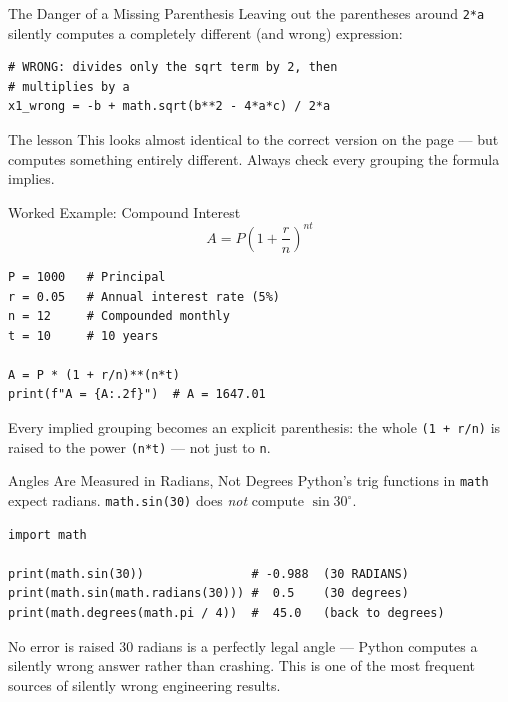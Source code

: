 \documentclass[9pt,aspectratio=169,xcolor=table]{beamer}
\begin{document}
\begin{frame}[fragile]{The Danger of a Missing Parenthesis}
    \leavevmode
    Leaving out the parentheses around \texttt{2*a} silently computes a
    \alert{completely different} (and wrong) expression:

\begin{lstlisting}
# WRONG: divides only the sqrt term by 2, then
# multiplies by a
x1_wrong = -b + math.sqrt(b**2 - 4*a*c) / 2*a
\end{lstlisting}

    \vspace{2mm}
    \begin{alertblock}{The lesson}
        This looks almost identical to the correct version on the page
        --- but computes something entirely different. Always check
        every grouping the formula implies.
    \end{alertblock}
\end{frame}

\begin{frame}[fragile]{Worked Example: Compound Interest}
    \leavevmode
    \[
    A = P\left(1 + \frac{r}{n}\right)^{nt}
    \]

\begin{lstlisting}
P = 1000   # Principal
r = 0.05   # Annual interest rate (5%)
n = 12     # Compounded monthly
t = 10     # 10 years

A = P * (1 + r/n)**(n*t)
print(f"A = {A:.2f}")  # A = 1647.01
\end{lstlisting}

    \vspace{1mm}
    {\small Every implied grouping becomes an explicit parenthesis: the
    whole \texttt{(1 + r/n)} is raised to the power \texttt{(n*t)} ---
    not just to \texttt{n}.}
\end{frame}

\begin{frame}[fragile]{Angles Are Measured in Radians, Not Degrees}
    \leavevmode
    Python's trig functions in \texttt{math} expect \alert{radians}.
    \texttt{math.sin(30)} does \emph{not} compute $\sin 30^\circ$.

\begin{lstlisting}
import math

print(math.sin(30))               # -0.988  (30 RADIANS)
print(math.sin(math.radians(30))) #  0.5    (30 degrees)
print(math.degrees(math.pi / 4))  #  45.0   (back to degrees)
\end{lstlisting}

    \vspace{2mm}
    \begin{alertblock}{No error is raised}
        $30$ radians is a perfectly legal angle --- Python computes a
        silently wrong answer rather than crashing. This is one of the
        most frequent sources of silently wrong engineering results.
    \end{alertblock}
\end{frame}
\end{document}
